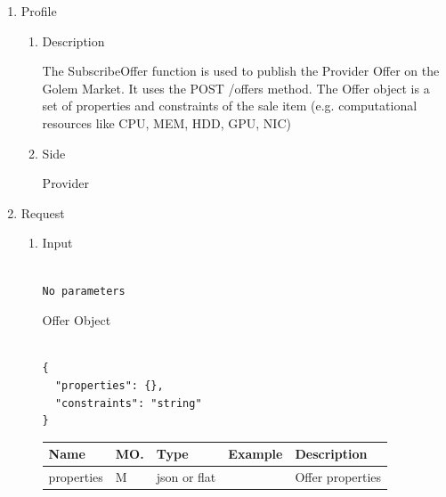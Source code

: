 

\begin{enumerate}

\item Profile

\begin{enumerate}

\item Description

The SubscribeOffer function is used to publish the Provider Offer on the Golem Market. It uses the POST /offers method.
The Offer object is a set of properties and constraints of the sale item (e.g. computational resources like CPU, MEM, HDD, GPU, NIC)

\item Side

Provider

\end{enumerate}

\item Request

\begin{enumerate}

\item Input

\begin{tcolorbox}[boxrule=0pt, frame empty]
\begin{verbatim}

No parameters

\end{verbatim}
\end{tcolorbox}

Offer Object

\begin{tcolorbox}[boxrule=0pt, frame empty]
\begin{verbatim}

{
  "properties": {},
  "constraints": "string"
}

\end{verbatim}
\end{tcolorbox}

\begin{center}
\begin{tabular}{|p{3cm}|l|p{3cm}|p{3cm}|p{4cm}|} 
\hline
\rowcolor{lightgray}	Name	& MO.	& Type	& Example & 	Description \\
\hline

properties	& M	& 	json or flat	&		&	Offer properties \\ 


\end{tabular}
\end{center}
\end{enumerate}
\end{enumerate}
